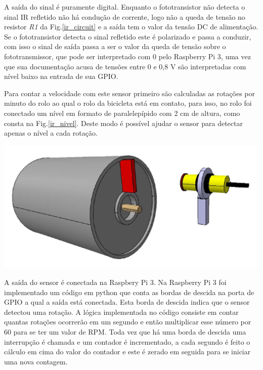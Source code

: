 	A saída do sinal é puramente digital. Enquanto o fototransistor não detecta o sinal IR refletido não há condução de corrente, logo não a queda de tensão no resistor \textit{R1} da Fig.\ref{ir_circuit} e a saída tem o valor da tensão DC de alimentação. Se o fototransistor detecta o sinal refletido este é polarizado e passa a conduzir, com isso o sinal de saída passa a ser o valor da queda de tensão sobre o fototransmissor, que pode ser interpretado com 0 pelo Raspberry Pi 3, uma vez que sua documentação acusa de tensões entre 0 e 0,8 V são interpretadas com nível baixo na entrada de sua GPIO.
    
    	Para contar a velocidade com este sensor primeiro são calculadas as rotações por minuto do rolo ao qual o rolo da bicicleta está em contato, para isso, no rolo foi conectado um nível em formato de paralelepípido com 2 cm de altura, como consta na Fig.\ref{ir_nivel}. Deste modo é possível ajudar o sensor para detectar apenas o nível a cada rotação.
        
           \begin{center}
    	\includegraphics[scale=0.57]{figuras/ir_nivel.png}
        \label{ir_nivel}
    \end{center}        
    
    	A saída do sensor é conectada na Raspbery Pi 3. Na Raspberry  Pi 3 foi implementado um código em python que conta as bordas de descida na porta de GPIO a qual a saída está conectada. Esta borda de descida indica que o sensor detectou uma rotação. A lógica implementada no código consiste em contar quantas rotações ocorrerão em um segundo e então multiplicar esse número por 60 para se ter um valor de RPM. Toda vez que há uma borda de descida uma interrupção é chamada e um contador é incrementado, a cada segundo é feito o cálculo em cima do valor do contador e este é zerado em seguida para se iniciar uma nova contagem.
 
